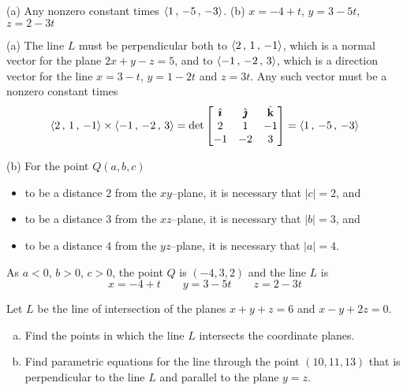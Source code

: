%

\begin{answer}
(a) Any nonzero constant times $\left< 1 \,,\, -5 \,,\, -3 \right>$.\qquad
(b) $x = -4 + t$, 
    $y = 3 - 5t$,
    $z = 2 - 3t$
\end{answer}

\begin{solution}
(a) The line $L$ must be perpendicular both to 
        $\left< 2\,,\,1\,,\,-1\right>$, which is a normal vector 
        for the plane $2x + y  - z = 5$,
and to
        $\left< -1\,,\,-2\,,\,3\right>$, which is a direction vector for
the line $x = 3 - t$, $y = 1 - 2t$ and $z = 3t$.
Any such vector must be a nonzero constant times
\begin{align*}
\left< 2\,,\,1\,,\,-1\right> \times \left< -1\,,\,-2\,,\,3\right>
    =\det\left[\begin{matrix}
            \hat{\pmb{\imath}}  &  \hat{\pmb{\jmath}}  &  \hat{\mathbf{k}} \\
            2    &   1   &    -1 \\
           -1    &  -2   &   3 
            \end{matrix}\right]
=\left< 1 \,,\, -5 \,,\, -3 \right>
\end{align*}

(b) For the point $Q(a, b, c)$
\begin{itemize}
\item
to be a distance $2$ from the $xy$--plane, it is necessary that $|c|=2$,
and
\item
to be a distance $3$ from the $xz$--plane, it is necessary that $|b|=3$,
and
\item
to be a distance $4$ from the $yz$--plane, it is necessary that $|a|=4$.
\end{itemize}
As $a < 0$, $b > 0$, $c > 0$, the point $Q$ is $(-4, 3, 2)$ and the line $L$
is
\begin{equation*}
x = -4 + t \qquad
y = 3 - 5t \qquad
z = 2 - 3t 
\end{equation*}
\end{solution}

\begin{question}[M200 2012D] %
Let $L$ be the line of intersection of the planes $x + y + z = 6$ and 
$x - y + 2z = 0$.
\begin{enumerate}[(a)]
\item
Find the points in which the line $L$ intersects the coordinate planes.
\item
Find parametric equations for the line through the point $(10, 11, 13)$ 
that is perpendicular to the line $L$ and parallel to the plane $y = z$.
\end{enumerate}
\end{question}

